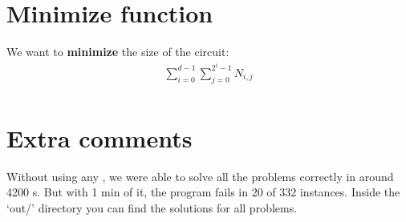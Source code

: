 \documentclass[letterpaper,10pt]{article}
\begin{document}
\section{Minimize function}
We want to \textbf{minimize} the size of the circuit:
\begin{align*}
    \sum_{i=0}^{d-1} \sum_{j=0}^{2^i-1} N_{i,j} \\
\end{align*}

\section{Extra comments}
Without using any , we were able to solve all the problems correctly in around 4200 s. But with 1 min of it, the program fails in 20 of 332 instances. Inside the `out/' directory you can find the solutions for all problems.
\end{document}
